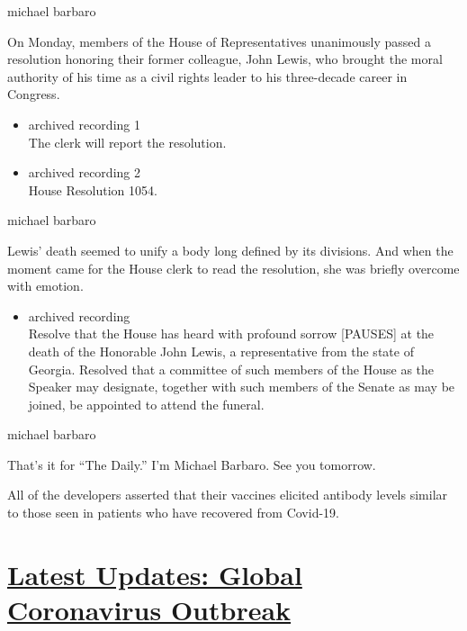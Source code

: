 michael barbaro

On Monday, members of the House of Representatives unanimously passed a
resolution honoring their former colleague, John Lewis, who brought the
moral authority of his time as a civil rights leader to his three-decade
career in Congress.

\begin{itemize}
\item
  archived recording 1\\
  The clerk will report the resolution.
\item
  archived recording 2\\
  House Resolution 1054.
\end{itemize}

michael barbaro

Lewis' death seemed to unify a body long defined by its divisions. And
when the moment came for the House clerk to read the resolution, she was
briefly overcome with emotion.

\begin{itemize}
\tightlist
\item
  archived recording\\
  Resolve that the House has heard with profound sorrow {[}PAUSES{]} at
  the death of the Honorable John Lewis, a representative from the state
  of Georgia. Resolved that a committee of such members of the House as
  the Speaker may designate, together with such members of the Senate as
  may be joined, be appointed to attend the funeral.
\end{itemize}

michael barbaro

That's it for ``The Daily.'' I'm Michael Barbaro. See you tomorrow.

All of the developers asserted that their vaccines elicited antibody
levels similar to those seen in patients who have recovered from
Covid-19.

\hypertarget{latest-updates-global-coronavirus-outbreak}{%
\section{\texorpdfstring{\href{https://www.nytimes.com/2020/08/01/world/coronavirus-covid-19.html?action=click\&pgtype=Article\&state=default\&region=MAIN_CONTENT_1\&context=storylines_live_updates}{Latest
Updates: Global Coronavirus
Outbreak}}{Latest Updates: Global Coronavirus Outbreak}}\label{latest-updates-global-coronavirus-outbreak}}


